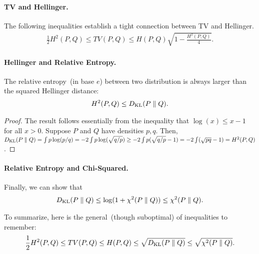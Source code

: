\documentclass[12pt]{article}
\begin{document}
\paragraph{TV and Hellinger.} The following inequalities establish a tight connection between TV and Hellinger. 
\begin{align}
\frac{1}{2} H^2(P, Q) \leq TV(P, Q) \leq H(P, Q) \sqrt{1 - \frac{H^2(P, Q)}{4}}. 
\end{align}

\paragraph{Hellinger and Relative Entropy.} The relative entropy~(in base $e$) between two distribution is always larger than the squared Hellinger distance: 
\begin{align}
H^2(P, Q) \leq D_{\text{KL}}(P \parallel Q). 
\end{align}
\begin{proof}
The result follows essentially from the inequality that $\log(x) \leq x- 1$ for all $x > 0$. Suppose $P$ and $Q$ have densities $p,q$. Then, $D_{\text{KL}}(P \parallel Q) = \int p \log (p/q) = -2 \int p \log( \sqrt{q/p}) \geq -2 \int p (\sqrt{q/p} - 1) = -2 \int (\sqrt{pq} - 1)  = H^2(P, Q)$. 
\end{proof}
\paragraph{Relative Entropy and Chi-Squared.} Finally, we can show that 
\begin{align}
D_{\text{KL}}(P \parallel Q) \leq \log(1 + \chi^2(P \parallel Q)) \leq \chi^2(P \parallel Q). 
\end{align}


\begin{proposition}
	\label{prop:summary-of-inequalities}
	To summarize, here is the general~(though suboptimal) of inequalities to remember: 
	\begin{align}
	\frac{1}{2}H^2(P, Q) \leq TV(P, Q) \leq H(P, Q) \leq \sqrt{D_{\text{KL}}(P \parallel Q)} \leq \sqrt{\chi^2(P \parallel Q)}. 
	\end{align}
\end{proposition}
\end{document}
